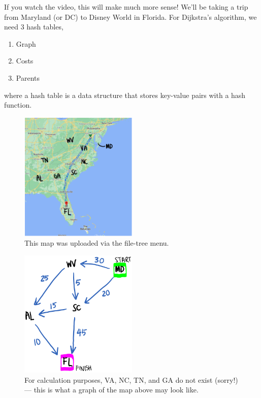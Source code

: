 \documentclass{article}
\begin{document}
If you watch the video, this will make much more sense! We'll be taking a trip from Maryland (or DC) to Disney World in Florida. For Dijkstra's algorithm, we need 3 hash tables,
\begin{enumerate}
    \item Graph
    \item Costs
    \item Parents
\end{enumerate}
where a hash table is a data structure that stores key-value pairs with a hash function.

\begin{figure}
    \centering
    \includegraphics[width=0.5\textwidth]{map.png}
    \caption{\label{fig:map}This map was uploaded via the file-tree menu.}
\end{figure}

\begin{figure}
    \centering
    \includegraphics[width=0.5\textwidth]{nodes.png}
    \caption{\label{fig:nodes}For calculation purposes, VA, NC, TN, and GA do not exist (sorry!) — this is what a graph of the map above may look like.}
    \label{fig:my_label}
\end{figure}
\end{document}
